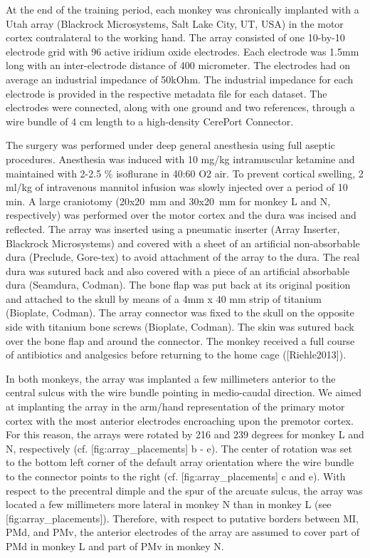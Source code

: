 At the end of the training period, each monkey was chronically implanted with a Utah array (Blackrock Microsystems, Salt Lake City, UT, USA) in the motor cortex contralateral to the working hand. The array consisted of one 10-by-10 electrode grid with 96 active iridium oxide electrodes. Each electrode was 1.5mm long with an inter-electrode distance of 400 micrometer. The electrodes had on average an industrial impedance of 50kOhm. The industrial impedance for each electrode is provided in the respective metadata file for each dataset. The electrodes were connected, along with one ground and two references, through a wire bundle of 4 cm length to a high-density CerePort Connector. 

The surgery was performed under deep general anesthesia using full aseptic procedures. Anesthesia was induced with 10 mg/kg intramuscular ketamine and maintained with 2-2.5 \% isoflurane in 40:60 O2 air. To prevent cortical swelling, 2 ml/kg of intravenous mannitol infusion was slowly injected over a period of 10 min. A large craniotomy (20x20 mm and 30x20 mm for monkey L and N, respectively) was performed over the motor cortex and the dura was incised and reflected. The array was inserted using a pneumatic inserter (Array Inserter, Blackrock Microsystems) and covered with a sheet of an artificial non-absorbable dura (Preclude, Gore-tex) to avoid attachment of the array to the dura. The real dura was sutured back and also covered with a piece of an artificial absorbable dura (Seamdura, Codman). The bone flap was put back at its original position and attached to the skull by means of a 4mm x 40 mm strip of titanium (Bioplate, Codman). The array connector was fixed to the skull on the opposite side with titanium bone screws (Bioplate, Codman). The skin was sutured back over the bone flap and around the connector. The monkey received a full course of antibiotics and analgesics before returning to the home cage ([Riehle2013]).

In both monkeys, the array was implanted a few millimeters anterior to the central sulcus with the wire bundle pointing in medio-caudal direction. We aimed at implanting the array in the arm/hand representation of the primary motor cortex with the most anterior electrodes encroaching upon the premotor cortex. For this reason, the arrays were rotated by 216 and 239 degrees for monkey L and N, respectively (cf. [fig:array\_placements] b - e). The center of rotation was set to the bottom left corner of the default array orientation where the wire bundle to the connector points to the right (cf. [fig:array\_placements] c and e). With respect to the precentral dimple and the spur of the arcuate sulcus, the array was located a few millimeters more lateral in monkey N than in monkey L (see [fig:array\_placements]). Therefore, with respect to putative borders between MI, PMd, and PMv, the anterior electrodes of the array are assumed to cover part of PMd in monkey L and part of PMv in monkey N. 

